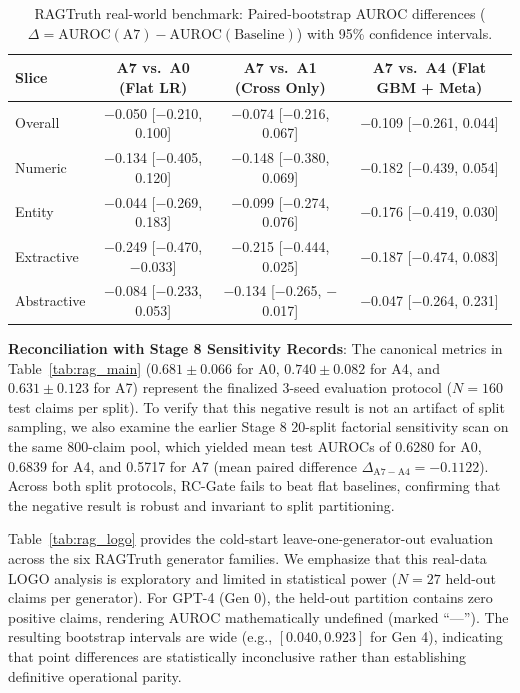 \documentclass[pdflatex,sn-mathphys,Numbered]{sn-jnl}
\begin{document}
\begin{table}[htbp]
\caption{RAGTruth real-world benchmark: Paired-bootstrap AUROC differences ($\Delta = \mathrm{AUROC}(\text{A7}) - \mathrm{AUROC}(\text{Baseline})$) with 95\% confidence intervals.}\label{tab:rag_paired}
\footnotesize
\setlength{\tabcolsep}{3.5pt}
\begin{tabular}{@{}lccc@{}}
\toprule
\textbf{Slice} & \textbf{A7 vs.\ A0 (Flat LR)} & \textbf{A7 vs.\ A1 (Cross Only)} & \textbf{A7 vs.\ A4 (Flat GBM + Meta)} \\
\midrule
Overall & $-$0.050 [$-$0.210, 0.100] & $-$0.074 [$-$0.216, 0.067] & $-$0.109 [$-$0.261, 0.044] \\
Numeric & $-$0.134 [$-$0.405, 0.120] & $-$0.148 [$-$0.380, 0.069] & $-$0.182 [$-$0.439, 0.054] \\
Entity & $-$0.044 [$-$0.269, 0.183] & $-$0.099 [$-$0.274, 0.076] & $-$0.176 [$-$0.419, 0.030] \\
Extractive & $-$0.249 [$-$0.470, $-$0.033] & $-$0.215 [$-$0.444, 0.025] & $-$0.187 [$-$0.474, 0.083] \\
Abstractive & $-$0.084 [$-$0.233, 0.053] & $-$0.134 [$-$0.265, $-$0.017] & $-$0.047 [$-$0.264, 0.231] \\
\bottomrule
\end{tabular}
\end{table}

\noindent \textbf{Reconciliation with Stage 8 Sensitivity Records}: The canonical metrics in Table~\ref{tab:rag_main} ($0.681\pm0.066$ for A0, $0.740\pm0.082$ for A4, and $0.631\pm0.123$ for A7) represent the finalized 3-seed evaluation protocol ($N = 160$ test claims per split). To verify that this negative result is not an artifact of split sampling, we also examine the earlier Stage 8 20-split factorial sensitivity scan on the same 800-claim pool, which yielded mean test AUROCs of 0.6280 for A0, 0.6839 for A4, and 0.5717 for A7 (mean paired difference $\Delta_{\mathrm{A7 - A4}} = -0.1122$). Across both split protocols, RC-Gate fails to beat flat baselines, confirming that the negative result is robust and invariant to split partitioning.

Table~\ref{tab:rag_logo} provides the cold-start leave-one-generator-out evaluation across the six RAGTruth generator families. We emphasize that this real-data LOGO analysis is exploratory and limited in statistical power ($N=27$ held-out claims per generator). For GPT-4 (Gen 0), the held-out partition contains zero positive claims, rendering AUROC mathematically undefined (marked ``---''). The resulting bootstrap intervals are wide (e.g., $[0.040, 0.923]$ for Gen 4), indicating that point differences are statistically inconclusive rather than establishing definitive operational parity.
\end{document}
